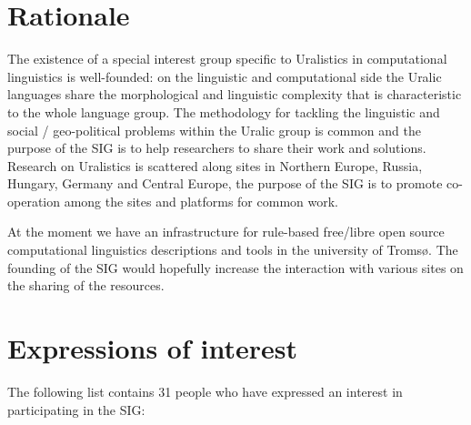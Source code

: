 \documentclass[11pt,a4paper]{article}
\begin{document}
\section*{Rationale}
The existence of a special interest group specific to
Uralistics in computational linguistics is well-founded: on the
linguistic and computational side the Uralic languages share the
morphological and linguistic complexity that is characteristic to the whole
language group. The methodology for tackling the linguistic and
social / geo-political problems within the Uralic group is common and
the purpose of the SIG is to help researchers to share their work and
solutions. Research on Uralistics is scattered along sites in Northern
Europe, Russia, Hungary, Germany and Central Europe, the purpose of the
SIG is to promote co-operation among the sites and platforms for 
common work.

At the moment we have an infrastructure for rule-based free/libre open
source computational linguistics descriptions and tools in the
university of Tromsø. The founding of the SIG would hopefully
increase the interaction with various sites on the sharing of the
resources. 

\section*{Expressions of interest}

The following list contains 31 people who have expressed an interest in 
participating in the SIG:
\end{document}
